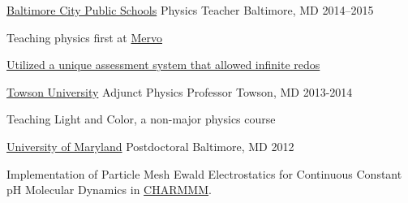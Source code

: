 \begin{cventries}
\cventry
    {\href{http://www.baltimorecityschools.org/}{Baltimore City Public Schools}}
    {Physics Teacher}
    {Baltimore, MD} {2014--2015}
    {
    \begin{cvitems}
      \item {Teaching physics first at \href{http://mervo.org}{Mervo}}
      \item {\href{https://github.com/jphafner/physicsAMC}{Utilized a unique assessment system that allowed infinite redos}}
    \end{cvitems}
    }

\cventry
    {\href{www.towson.edu}{Towson University}}
    {Adjunct Physics Professor}
    {Towson, MD} {2013-2014}
    {
    \begin{cvitems}
        \item Teaching Light and Color, a non-major physics course
    \end{cvitems}
    }



\cventry
    {\href{www.umaryland.edu}{University of Maryland}}
    {Postdoctoral}
    {Baltimore, MD} {2012}
    {
    \begin{cvitems}
        \item Implementation of Particle Mesh Ewald Electrostatics for Continuous Constant pH Molecular Dynamics in \href{www.charmm.org}{CHARMMM}.
    \end{cvitems}
    }



\end{cventries}


